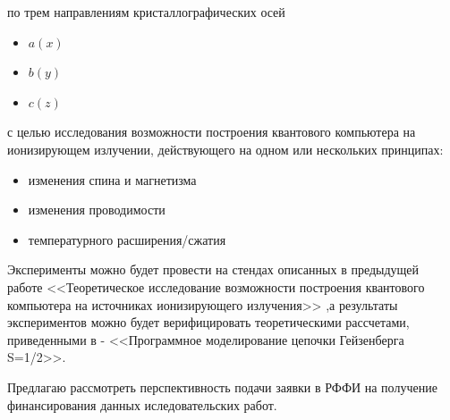 \documentclass[11pt]{article}
\begin{document}
по трем направлениям кристаллографических осей
\begin{itemize} 
\item $a(x)$
\item $b(y)$
\item $c(z)$
\end{itemize} 

с целью исследования возможности построения квантового компьютера на ионизирующем излучении, действующего на одном или нескольких принципах:
\begin{itemize} 
\item изменения спина и магнетизма
\item изменения проводимости
\item температурного расширения/сжатия
\end{itemize} 

Эксперименты можно будет провести на стендах описанных в предыдущей работе <<Теоретическое исследование возможности построения квантового компьютера на источниках ионизирующего излучения>> ,а результаты экспериментов можно будет верифицировать теоретическими рассчетами, приведенными в - <<Программное моделирование цепочки Гейзенберга S=1/2>>.

Предлагаю рассмотреть перспективность подачи заявки в РФФИ на получение финансирования данных иследовательских работ.
\end{document}
